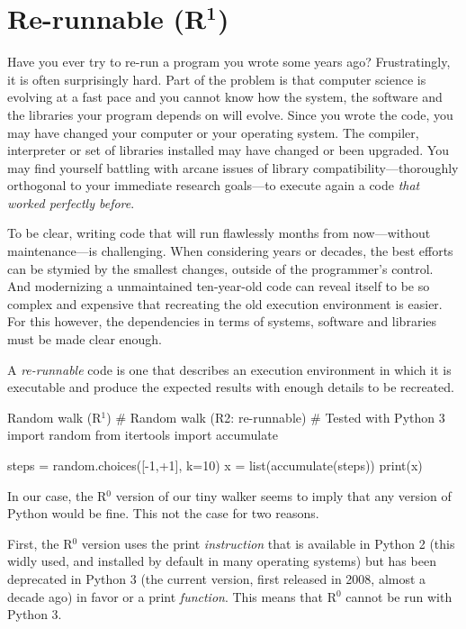 \documentclass[a4paper,11pt]{article}
\begin{document}
\clearpage
\section*{Re-runnable (R$^{\mathbf 1}$)}

Have you ever try to re-run a program you wrote some years ago? Frustratingly, it is often surprisingly hard. 
Part of the problem is that computer science is evolving at a fast pace and you cannot know how the system, the software and the libraries your program depends on will evolve.
Since you wrote the code, you may have changed your computer or your operating system. The compiler, interpreter or set of libraries installed may have changed or been upgraded. 
You may find yourself battling with arcane issues of library compatibility---thoroughly orthogonal to your immediate research goals---to execute again a code \emph{that worked perfectly before}. 

To be clear, writing code that will run flawlessly months from now---without maintenance---is challenging. When considering years or decades, the best efforts can be stymied by the smallest changes, outside of the programmer's control. And modernizing a unmaintained ten-year-old code can reveal itself to be so complex and expensive that recreating the old execution environment is easier. For this however, the dependencies in terms of systems, software and libraries must be made clear enough.

A \emph{re-runnable} code is one that describes an execution environment in which it is executable and produce the expected results with enough details to be recreated.

\cite{Collberg:2016}

\begin{code}{Random walk (R$^1$)}
# Random walk (R2: re-runnable)
# Tested with Python 3
import random
from itertools import accumulate

steps = random.choices([-1,+1], k=10)
x = list(accumulate(steps))
print(x) 
\end{code}

In our case, the R$^0$ version of our tiny walker seems to imply that any version of Python would be fine. This not the case for two reasons.

First, the R$^0$ version uses the print {\em instruction} that is available in Python 2 (this widly used, and installed by default in many operating systems) but has been deprecated in Python 3 (the current version, first released in 2008, almost a decade ago) in favor or a  print {\em function}.
This means that R$^0$ cannot be run with Python 3. 
\end{document}
